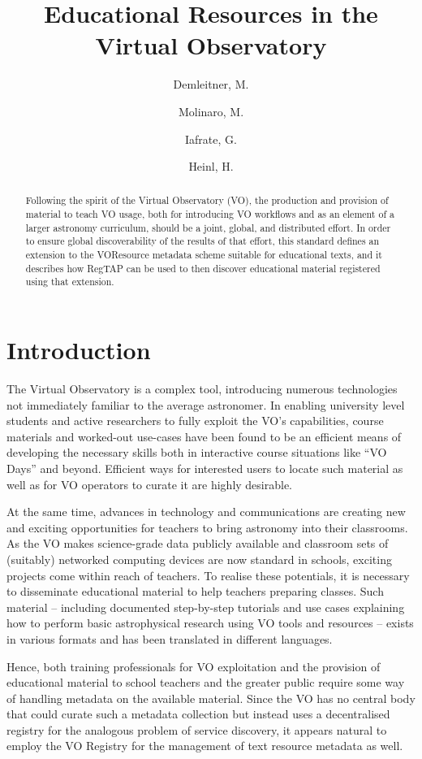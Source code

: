 \documentclass{ivoa}
\author{Demleitner, M.}
\author{Molinaro, M.}
\author{Iafrate, G.}
\author{Heinl, H.}
\title{Educational Resources in the Virtual Observatory}
\begin{document}
\begin{abstract}
Following the spirit of the Virtual Observatory (VO), the production and
provision of material to teach VO usage, both for introducing VO
workflows and as an element of a larger astronomy curriculum, should be
a joint, global, and distributed effort.  In order to ensure global
discoverability of the results of that effort, this standard defines an
extension to the VOResource metadata scheme suitable for educational
texts, and it describes how RegTAP can be used to then discover
educational material registered using that extension.

\end{abstract}


\section{Introduction}

The Virtual Observatory is a complex tool, introducing numerous
technologies not immediately familiar to the average astronomer.
In enabling university level students
and active researchers to fully exploit the VO's capabilities, course
materials and worked-out use-cases have been found to be an efficient means of
developing the necessary skills both in interactive course situations
like ``VO Days'' and beyond.
Efficient ways for interested users to locate such
material as well as for VO operators to curate it are highly desirable.

At the same time, advances in technology and
communications are creating new and exciting
opportunities for teachers to bring astronomy into their
classrooms.  As the VO makes science-grade data publicly available and
classroom sets of (suitably) networked computing devices are now
standard in schools, exciting projects come within
reach of teachers.  To realise these potentials,
it is necessary to disseminate educational material to help teachers
preparing classes.  Such material -- including documented step-by-step
tutorials and use cases explaining how to perform basic astrophysical research
using VO tools and resources -- exists in various formats and
has been translated in different languages.

Hence, both training professionals for VO exploitation and the provision
of educational material to school teachers and the greater public
require some way of handling metadata on the available material.  Since
the VO has no central body that could curate such a metadata collection
but instead uses a decentralised registry for the analogous problem of
service discovery, it appears natural to employ the VO Registry for the
management of text resource metadata as well.
\end{document}
